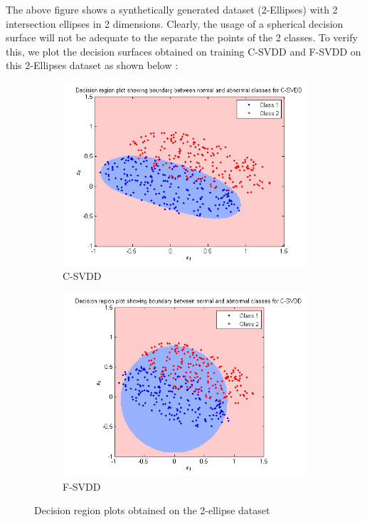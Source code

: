 \documentclass{article} %
\begin{document}
The above figure shows a synthetically generated dataset (2-Ellipses) with 2 intersection ellipses in 2 dimensions.  Clearly, the usage of a spherical decision surface will not be adequate to the separate the points of the 2 classes. To verify this, we plot the decision surfaces obtained on training C-SVDD and F-SVDD on this 2-Ellipses dataset as shown below :

\begin{figure}
\begin{subfigure}{.5\textwidth}
  \centering
  \includegraphics[width=\linewidth]{../Code/Ellipse/svdd/decn}
\caption{C-SVDD} 
\end{subfigure}%
\begin{subfigure}{.5\textwidth}
  \centering
  \includegraphics[width=\linewidth]{../Code/Ellipse/fsvdd/decn}
\caption{F-SVDD}  
\end{subfigure}
\caption{Decision region plots obtained on the 2-ellipse dataset}
\end{figure}
\end{document}
